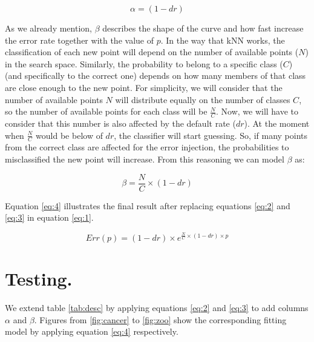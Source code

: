 \documentclass{article}
\begin{document}
\begin{equation}\label{eq:2}
  \alpha = (1-dr)
\end{equation}

As we already mention, $\beta$ describes the shape of the curve and how fast increase the error rate together with the value of $p$. In the way that kNN works, the classification of each new point will depend on the number of available points ($N$) in the search space.  Similarly, the probability to belong to a specific class ($C$) (and specifically to the correct one) depends on how many members of that class are close enough to the new point. For simplicity, we will consider that the number of available points $N$ will distribute equally on the number of classes $C$, so the number of available points for each class will be $\frac{N}{C}$.  Now, we will have to consider that this number is also affected by the default rate ($dr$).  At the moment when $\frac{N}{C}$ would be below of $dr$, the classifier will start guessing. So, if many points from the correct class are affected for the error injection, the probabilities to misclassified the new point will increase.  From this reasoning we can model $\beta$ as: 

\begin{equation}\label{eq:3}
  \beta = \frac{N}{C} \times (1-dr)
\end{equation}

Equation \ref{eq:4} illustrates the final result after replacing equations \ref{eq:2} and \ref{eq:3} in equation \ref{eq:1}.

\begin{equation}\label{eq:4}
  Err(p)=(1-dr) \times e^{\frac{N}{C} \times (1-dr) \times p}
\end{equation}


\section{Testing.}

We extend table \ref{tab:desc} by applying equations \ref{eq:2} and \ref{eq:3} to add columns $\alpha$ and $\beta$.  Figures from \ref{fig:cancer} to \ref{fig:zoo} show the corresponding fitting model by applying equation \ref{eq:4} respectively.
\end{document}

